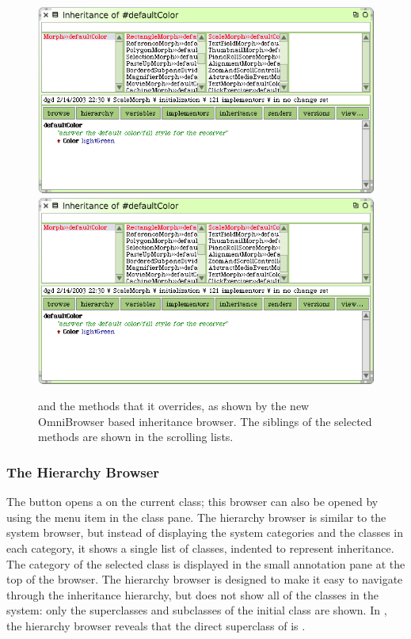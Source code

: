 \documentclass[a4paper,10pt,twoside]{book}
\begin{document}
\begin{figure}[btp]
	\begin{center}
   \ifluluelse
		{\includegraphics[width=\textwidth]{OBInheritanceOverriding}}
		{\includegraphics[scale=0.7]{OBInheritanceOverriding}}
	\end{center}
	\caption{ and the methods that it overrides, as shown by the new OmniBrowser based inheritance browser.   The siblings of the selected methods are shown in the scrolling lists.}
	\label{fig:OBinheritanceBrowser}
\end{figure}


\subsubsection{The Hierarchy Browser}
\label{sec:hierarchy}

The  button opens a  on the current class; this
browser can also be opened by using the  menu item in the class pane.
The hierarchy browser is similar to the system browser, but instead of displaying the system categories and the classes in each category, it shows a single list of classes, indented to represent inheritance.
The category of the selected class is displayed in the small annotation pane at the top of the browser.
The hierarchy browser is designed to make it easy to navigate through the inheritance hierarchy, but does not show all of the classes in the system: only the superclasses and subclasses of the initial class are shown.
In , the hierarchy browser reveals that the direct superclass of  is .
\end{document}
